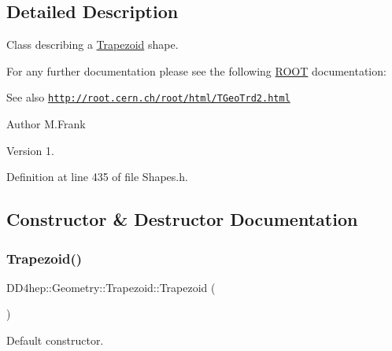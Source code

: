 \subsection{Detailed Description}
Class describing a \hyperlink{class_d_d4hep_1_1_geometry_1_1_trapezoid}{Trapezoid} shape. 

For any further documentation please see the following \hyperlink{namespace_r_o_o_t}{R\+O\+OT} documentation\+: \begin{DoxySeeAlso}{See also}
\href{http://root.cern.ch/root/html/TGeoTrd2.html}{\tt http\+://root.\+cern.\+ch/root/html/\+T\+Geo\+Trd2.\+html}
\end{DoxySeeAlso}
\begin{DoxyAuthor}{Author}
M.\+Frank 
\end{DoxyAuthor}
\begin{DoxyVersion}{Version}
1. 
\end{DoxyVersion}


Definition at line 435 of file Shapes.\+h.



\subsection{Constructor \& Destructor Documentation}
\hypertarget{class_d_d4hep_1_1_geometry_1_1_trapezoid_a2233ae95542275437ad2b479c37cdb72}{}\label{class_d_d4hep_1_1_geometry_1_1_trapezoid_a2233ae95542275437ad2b479c37cdb72} 
\subsubsection{\texorpdfstring{Trapezoid()}{Trapezoid()}\hspace{0.1cm}{\footnotesize\ttfamily [1/6]}}
{\footnotesize\ttfamily D\+D4hep\+::\+Geometry\+::\+Trapezoid\+::\+Trapezoid (\begin{DoxyParamCaption}{ }\end{DoxyParamCaption})\hspace{0.3cm}{\ttfamily [default]}}



Default constructor. 

\hypertarget{class_d_d4hep_1_1_geometry_1_1_trapezoid_a7133b1bf2eb1d878bfc880ade4566867}{}\label{class_d_d4hep_1_1_geometry_1_1_trapezoid_a7133b1bf2eb1d878bfc880ade4566867} 
